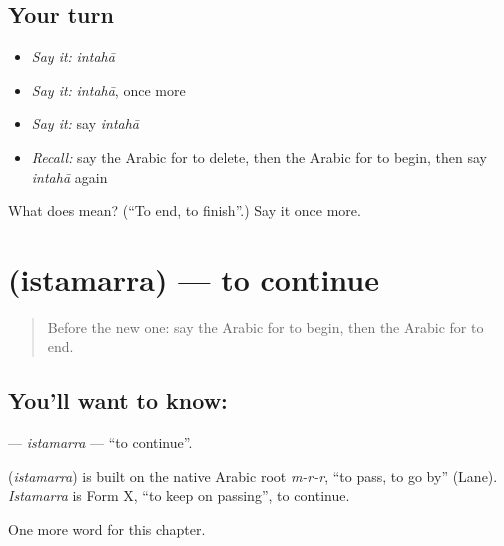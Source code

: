 \subsection*{Your turn}
\begin{itemize}
\raggedright
  \item \emph{Say it:} \emph{intahā}
  \item \emph{Say it:} \emph{intahā}, once more
  \item \emph{Say it:} say \emph{intahā}
  \item \emph{Recall:} say the Arabic for to delete, then the Arabic for to begin, then say \emph{intahā} again
\end{itemize}

\begin{tcolorbox}[breakable,colback=teal!4,colframe=teal!35!black,title={Before you move on}]
What does  mean? (\textquotedblleft{}To end, to finish\textquotedblright{}.) Say it once more.
\end{tcolorbox}
\section[\texorpdfstring{\ar{استمر} (istamarra)}{استمر (istamarra)}]{ (istamarra) — to continue}

\label{lesson:AR-C165-istamarra}



\begin{quote}
Before the new one: say the Arabic for to begin, then the Arabic for to end.
\end{quote}

\subsection*{You'll want to know: }
\textbf{} — \emph{istamarra} — \textquotedblleft{}to continue\textquotedblright{}.

\begin{cousinweb}
\textbf{} (\emph{istamarra}) is built on the native Arabic root \emph{m-r-r}, \textquotedblleft{}to pass, to go by\textquotedblright{} (Lane). \emph{Istamarra} is Form X, \textquotedblleft{}to keep on passing\textquotedblright{}, to continue.
\end{cousinweb}

\begin{grammarlens}[title={What you've built}]
One more word for this chapter.
\end{grammarlens}

